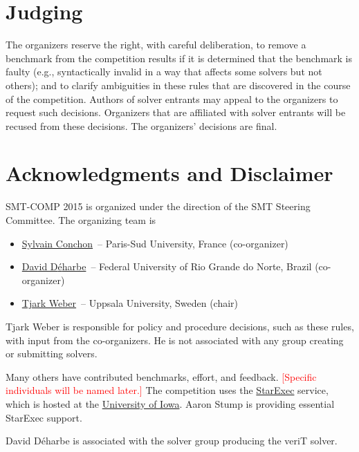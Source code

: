 \documentclass[12pt]{article}
\newcommand{\remark}[1]{{\small\textcolor{red}{[#1]}}}
\begin{document}

\section{Judging}

The organizers reserve the right, with careful deliberation, to remove
a benchmark from the competition results if it is determined that the
benchmark is faulty (e.g., syntactically invalid in a way that affects
some solvers but not others); and to clarify ambiguities in these
rules that are discovered in the course of the competition.  Authors
of solver entrants may appeal to the organizers to request such
decisions.  Organizers that are affiliated with solver entrants will
be recused from these decisions.  The organizers' decisions are final.


\section{Acknowledgments and Disclaimer}

SMT-COMP 2015 is organized under the direction of the SMT Steering
Committee. The organizing team is
%
\begin{itemize}
\setlength{\itemsep}{0pt}
\item \href{https://www.lri.fr/~conchon/}{Sylvain Conchon}~--
  Paris-Sud University, France (co-organizer)
\item \href{https://www.sites.google.com/site/deharbe/}{David
  D{\'e}harbe}~-- Federal University of Rio Grande do Norte, Brazil
  (co-organizer)
\item \href{http://user.it.uu.se/~tjawe125/}{Tjark Weber}~-- Uppsala
  University, Sweden (chair)
\end{itemize}
%
Tjark Weber is responsible for policy and procedure decisions, such as
these rules, with input from the co-organizers. He is not associated
with any group creating or submitting solvers.

Many others have contributed benchmarks, effort, and feedback.
\remark{Specific individuals will be named later.}
The competition uses the \href{https://www.starexec.org/}{StarExec}
service, which is hosted at the
\href{http://www.cs.uiowa.edu/}{University of Iowa}.  Aaron Stump is
providing essential StarExec support.

David D{\'e}harbe is associated with the solver group producing the
veriT solver.





\end{document}
